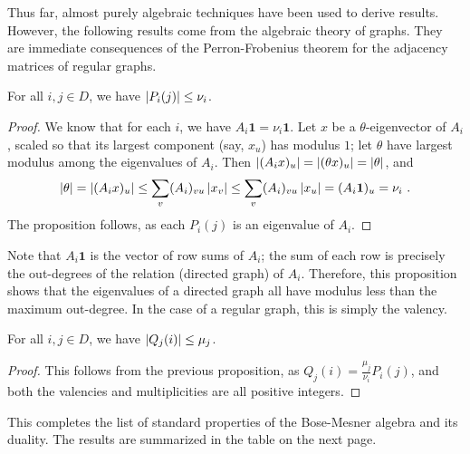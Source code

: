 \documentclass{report}
\newcommand{\vone}{\mathbf{1}}
\begin{document}
      Thus far, almost purely algebraic techniques have been used to derive
      results.  However, the following results come from the algebraic theory of
      graphs.  They are immediate consequences of the Perron-Frobenius theorem
      for the adjacency matrices of regular graphs.

      \begin{prop}
        For all $i, j \in D$, we have $\left\lvert P_i(j) \right\rvert \leq \nu_i$.
      \end{prop}

      \begin{proof}
        We know that for each $i$, we have $A_i \vone = \nu_i \vone$.
        Let $x$ be a $\theta$-eigenvector of $A_i$,
        scaled so that its largest component (say, $x_u$)
        has modulus $1$; let $\theta$ have largest modulus among the
        eigenvalues of $A_i$.
        Then $\left\lvert (A_i x)_u \right\rvert = \left\lvert (\theta x)_u \right\rvert = \left\lvert \theta \right\rvert$, and
        $$
          \abs{\theta}
          = \abs{(A_i x)_u}
          \leq \sum_{v} (A_i)_{vu} \abs{x_v}
          \leq \sum_{v} (A_i)_{vu} \abs{x_u}
          = (A_i \vone)_u = \nu_i
          \ .
        $$
        The proposition follows, as each $P_i(j)$ is an eigenvalue of $A_i$.
      \end{proof}

      Note that $A_i \vone$ is the vector of row sums of $A_i$; the sum of
      each row is precisely the out-degrees of the relation (directed graph) of
      $A_i$.  Therefore, this proposition shows that the eigenvalues of a
      directed graph all have modulus less than the maximum out-degree.  In the
      case of a regular graph, this is simply the valency.

      \begin{cor}
        For all $i, j \in D$, we have $\left\lvert Q_j(i) \right\rvert \leq \mu_j$.
      \end{cor}

      \begin{proof}
        This follows from the previous proposition, as $Q_j(i) =
        \frac{\mu_j}{\nu_i} P_i(j)$, and both the valencies and multiplicities
        are all positive integers.
      \end{proof}

      This completes the list of standard properties of the Bose-Mesner algebra
      and its duality.  The results are summarized in the table on the next
      page.

      \newpage
\end{document}
